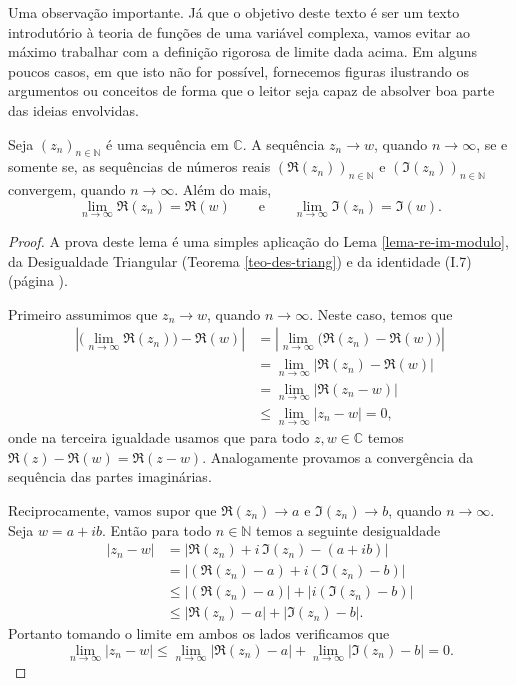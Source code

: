 Uma observação importante. 
Já que o objetivo deste texto é ser um texto introdutório à teoria de funções de uma variável complexa, 
vamos evitar ao máximo trabalhar com a definição rigorosa de limite dada acima. Em alguns poucos 
casos, em que isto não for possível, fornecemos figuras ilustrando os argumentos ou conceitos de forma que 
o leitor seja capaz de absolver boa parte das ideias envolvidas.
 
\begin{lema}
\label{lema-conv-parte-real-im-seq}
Seja $(z_n)_{n\in\mathbb{N}}$ é uma
sequência em $\mathbb{C}$. A sequência $z_n\to w$, quando $n\to \infty$, se e somente
se, as sequências de números reais $(\Re(z_n))_{n\in\mathbb{N}}$ e $(\Im(z_n))_{n\in\mathbb{N}}$ convergem, quando $n\to\infty$. Além do mais,
\[
\lim_{n\to\infty} \Re(z_n) = \Re(w)
\qquad \text{e} \qquad 
\lim_{n\to\infty} \Im(z_n) = \Im(w).
\]
\end{lema} 
\begin{proof}
A prova deste lema é uma simples aplicação do 
Lema \ref{lema-re-im-modulo}, da Desigualdade Triangular (Teorema \ref{teo-des-triang})
e da identidade (I.7) (página \pageref{page:eq-prop-basicas-conjugado}).

Primeiro assumimos que $z_n\to w$,
quando $n\to\infty$. 
Neste caso, temos que 
\begin{align*}
\left| 
\Big(\lim_{n\to\infty}\Re(z_n)\Big) -\Re(w)
\right|
&=
\left| 
\lim_{n\to\infty}\big(\Re(z_n) -\Re(w)\big)
\right|
\\[0.2cm]
&=
\lim_{n\to\infty}|\Re(z_n)-\Re(w)|
\\[0.2cm]
&=
\lim_{n\to\infty}|\Re(z_n-w)|
\\[0.2cm]
&\leq 
\lim_{n\to\infty}|z_n-w|
=
0,
\end{align*}
onde na terceira igualdade usamos que para todo $z,w\in\mathbb{C}$ temos
$\Re(z)-\Re(w) = \Re(z-w)$. Analogamente provamos a convergência da 
sequência das partes imaginárias. 

Reciprocamente, vamos supor que $\Re(z_n)\to a$ e $\Im(z_n)\to b$,
quando $n\to\infty$. Seja $w=a+ib$. Então para todo $n\in\mathbb{N}$
temos a seguinte desigualdade 
\begin{align*}
|z_n-w|
&=
|\Re(z_n)+i\,\Im(z_n) - (a+ib)|
\\
&=
|(\Re(z_n)-a)+i(\Im(z_n)-b)|
\\
&\leqslant
|(\Re(z_n)-a)|+|i(\Im(z_n)-b)|
\\
&\leqslant
|\Re(z_n)-a|+|\Im(z_n)-b|.
\end{align*} 
Portanto tomando o limite em ambos os lados verificamos que 
\[
\lim_{n\to\infty}|z_n-w|
\leqslant 
\lim_{n\to\infty}|\Re(z_n)-a| + 
\lim_{n\to\infty}|\Im(z_n)-b|
=0.
\]

\end{proof}

